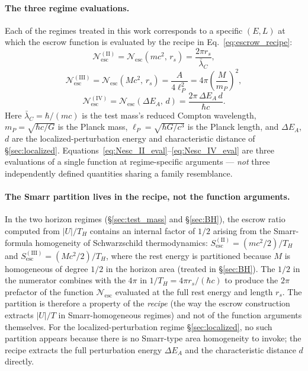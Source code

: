 \documentclass[11pt]{article}
\begin{document}
\paragraph{The three regime evaluations.} Each of the regimes treated in this work corresponds to a specific $(E, L)$ at which the escrow function is evaluated by the recipe in Eq.~\ref{eq:escrow_recipe}:
\begin{equation}
\mathcal{N}_{\mathrm{esc}}^{\mathrm{(II)}} = \mathcal{N}_{\mathrm{esc}}\!\left(mc^2,\, r_s\right) = \frac{2\pi r_s}{\bar{\lambda}_C},
\label{eq:Nesc_II_eval}
\end{equation}
\begin{equation}
\mathcal{N}_{\mathrm{esc}}^{\mathrm{(III)}} = \mathcal{N}_{\mathrm{esc}}\!\left(Mc^2,\, r_s\right) = \frac{A}{4\ell_P^2} = 4\pi\!\left(\frac{M}{m_P}\right)^{\!2},
\label{eq:Nesc_III_eval}
\end{equation}
\begin{equation}
\mathcal{N}_{\mathrm{esc}}^{\mathrm{(IV)}} = \mathcal{N}_{\mathrm{esc}}(\Delta E_A,\, d) = \frac{2\pi \, \Delta E_A \, d}{\hbar c}.
\label{eq:Nesc_IV_eval}
\end{equation}
Here $\bar{\lambda}_C = \hbar/(mc)$ is the test mass's reduced Compton wavelength, $m_P = \sqrt{\hbar c/G}$ is the Planck mass, $\ell_P = \sqrt{\hbar G/c^3}$ is the Planck length, and $\Delta E_A$, $d$ are the localized-perturbation energy and characteristic distance of \S\ref{sec:localized}. Equations~\ref{eq:Nesc_II_eval}--\ref{eq:Nesc_IV_eval} are three evaluations of a single function at regime-specific arguments — \emph{not} three independently defined quantities sharing a family resemblance.

\paragraph{The Smarr partition lives in the recipe, not the function arguments.} In the two horizon regimes (\S\ref{sec:test_mass} and \S\ref{sec:BH}), the escrow ratio computed from $|U|/T_H$ contains an internal factor of $1/2$ arising from the Smarr-formula homogeneity of Schwarzschild thermodynamics: $S_{\mathrm{esc}}^{(\mathrm{II})} = (mc^2/2)/T_H$ and $S_{\mathrm{esc}}^{(\mathrm{III})} = (Mc^2/2)/T_H$, where the rest energy is partitioned because $M$ is homogeneous of degree $1/2$ in the horizon area (treated in \S\ref{sec:BH}). The $1/2$ in the numerator combines with the $4\pi$ in $1/T_H = 4\pi r_s/(\hbar c)$ to produce the $2\pi$ prefactor of the function $\mathcal{N}_{\mathrm{esc}}$ evaluated at the full rest energy and length $r_s$. The partition is therefore a property of the \emph{recipe} (the way the escrow construction extracts $|U|/T$ in Smarr-homogeneous regimes) and not of the function arguments themselves. For the localized-perturbation regime \S\ref{sec:localized}, no such partition appears because there is no Smarr-type area homogeneity to invoke; the recipe extracts the full perturbation energy $\Delta E_A$ and the characteristic distance $d$ directly.
\end{document}
